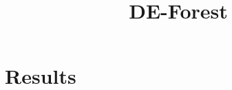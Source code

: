 \documentclass{llncs}
\title{DE-Forest}
\begin{document}
\maketitle

\section{Results}







\end{document}
